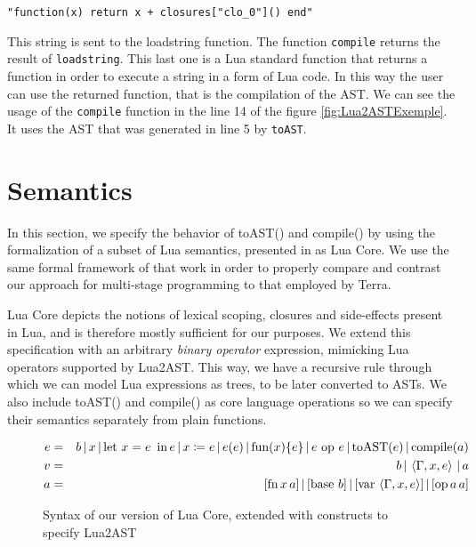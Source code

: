 \documentclass[english]{llncs}
\begin{document}
\begin{verbatim}
"function(x) return x + closures["clo_0"]() end"
\end{verbatim}

This string is sent to the loadstring function.
The function \texttt{compile} returns the result of \texttt{loadstring}.
This last one is a Lua standard function that returns a function in order to execute a string in a form of Lua code.
In this way the user can use the returned function, that is the compilation of the AST.
We can see the usage of the \texttt{compile} function in the line 14 of the figure \ref{fig:Lua2ASTExemple}.
It uses the AST that was generated in line 5 by \texttt{toAST}.



\section{Semantics}
\label{sec:semantics}

In this section, we specify the behavior of toAST() and compile()
by using the formalization of a subset of Lua semantics, presented
in \cite{DeVito2013Terra} as Lua Core. We use the same formal framework
of that work in order to properly compare and contrast our approach
for multi-stage programming to that employed by Terra.

Lua Core depicts the notions of lexical scoping, closures and side-effects
present in Lua, and is therefore mostly sufficient for our purposes.
We extend this specification with an arbitrary \emph{binary operator}
expression, mimicking Lua operators supported by Lua2AST. This way,
we have a recursive rule through which we can model Lua expressions
as trees, to be later converted to ASTs. We also include toAST() and
compile() as core language operations so we can specify their semantics
separately from plain functions.

\begin{figure}[t]
\begin{eqnarray*}
e & = & b\,|\, x\,|\,\mbox{let \ensuremath{x=e}\,\ in\,\ensuremath{e}}\,|\, x\coloneqq e\,|\, e(e)\,|\,\mbox{fun}(x)\{e\}\,|\, e\mbox{ op }e\,|\,\mbox{toAST}(e)\,|\,\mbox{compile}(a)\\
v & = & b\,|\,\left\langle \Gamma,x,e\right\rangle \,|\, a\\
a & = & [\mbox{fn\,\ensuremath{x}\,\ensuremath{a}}]\,|\,[\mbox{base \ensuremath{b}}]\,|\,[\mbox{var}\,\left\langle \Gamma,x,e\right\rangle ]\,|\,[\mbox{op\,\ensuremath{a}\,\ensuremath{a}}]
\end{eqnarray*}
\protect\caption{\label{fig:LuaCoreSyntax}Syntax of our version of Lua Core, extended
with constructs to specify Lua2AST}
\end{figure}
\end{document}
